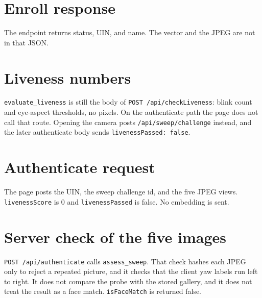 \clearpage
\section{Enroll response}
\label{sec:enroll-response}
\back
{\sffamily\small\color{ink}The endpoint returns status, UIN, and name. The vector and the JPEG are not in that JSON.}


\clearpage
\section{Liveness numbers}
\label{sec:liveness}
\back
{\sffamily\small\color{ink}\texttt{evaluate\_liveness} is still the body of \texttt{POST /api/checkLiveness}: blink count and eye-aspect thresholds, no pixels.
On the authenticate path the page does not call that route. Opening the camera posts \texttt{/api/sweep/challenge} instead, and the later authenticate body sends \texttt{livenessPassed: false}.}


\clearpage
\section{Authenticate request}
\label{sec:auth-request}
\back
{\sffamily\small\color{ink}The page posts the UIN, the sweep challenge id, and the five JPEG views.
\texttt{livenessScore} is 0 and \texttt{livenessPassed} is false. No embedding is sent.}


\clearpage
\section{Server check of the five images}
\label{sec:match}
\back
{\sffamily\small\color{ink}\texttt{POST /api/authenticate} calls \texttt{assess\_sweep}.
That check hashes each JPEG only to reject a repeated picture, and it checks that the client yaw labels run left to right.
It does not compare the probe with the stored gallery, and it does not treat the result as a face match. \texttt{isFaceMatch} is returned false.}


